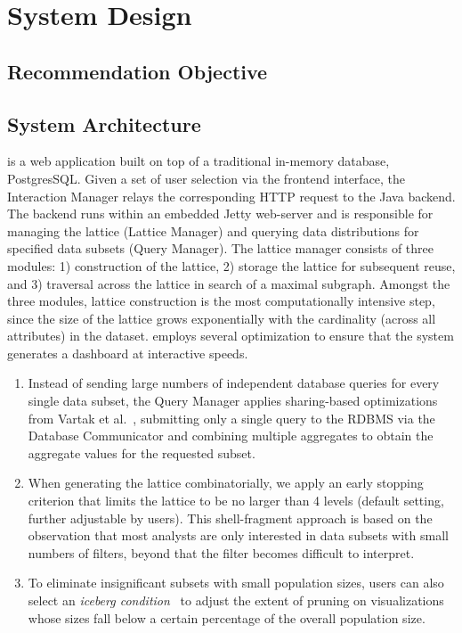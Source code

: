 \section{System Design}
\subsection{Recommendation Objective}
\subsection{System Architecture}
\vispilot is a web application built on top of a traditional in-memory database, PostgresSQL. Given a set of user selection via the frontend interface, the Interaction Manager relays the corresponding HTTP request to the Java backend. The backend runs within an embedded Jetty web-server and is responsible for managing the lattice (Lattice Manager) and querying data distributions for specified data subsets (Query Manager). The lattice manager consists of three modules: 1) construction of the lattice, 2) storage the lattice for subsequent reuse, and 3) traversal across the lattice in search of a maximal subgraph. Amongst the three modules, lattice construction is the most computationally intensive step, since the size of the lattice grows exponentially with the cardinality (across all attributes) in the dataset. \vispilot employs several optimization to ensure that the system generates a dashboard at interactive speeds.
\begin{enumerate}
	\item Instead of sending large numbers of independent database queries for every single data subset, the Query Manager applies sharing-based optimizations from Vartak et al.~\cite{Vartak2015}, submitting only a single query to the RDBMS via the Database Communicator and combining multiple aggregates to obtain the aggregate values for the requested subset.
	\item When generating the lattice combinatorially, we apply an early stopping criterion that limits the lattice to be no larger than 4 levels (default setting, further adjustable by users). This shell-fragment approach \cite{Li2004} is based on the observation that most analysts are only interested in data subsets with small numbers of filters, beyond that the filter becomes difficult to interpret. %
	\item To eliminate insignificant subsets with small population sizes, users can also select an \textit{iceberg condition}~\cite{Xin2007} to adjust the extent of pruning on visualizations whose sizes fall below a certain percentage of the overall population size. %
\end{enumerate}
